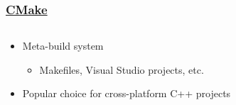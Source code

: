 \documentclass[glossy]{beamer}
\begin{document}
\begin{frame}[fragile=singleslide]
  \frametitle{\href{https://cmake.org/}{CMake}}

  \begin{columns}[t]
    \begin{column}{5cm}
      \begin{itemize}
        \item Meta-build system
        \begin{itemize}
          \item Makefiles, Visual Studio projects, etc.
        \end{itemize}
        \item Popular choice for cross-platform C++ projects
      \end{itemize}
    \end{column}

    \begin{column}{7cm}
    \end{column}
  \end{columns}
\end{frame}

\end{document}

